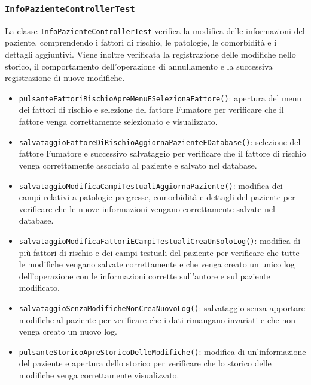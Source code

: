 \subsubsection*{\texttt{InfoPazienteControllerTest}}

La classe \texttt{InfoPazienteControllerTest} verifica la modifica delle informazioni del paziente, comprendendo i fattori di rischio, le patologie, le comorbidità e i dettagli aggiuntivi. Viene inoltre verificata la registrazione delle modifiche nello storico, il comportamento dell'operazione di annullamento e la successiva registrazione di nuove modifiche.

\begin{itemize}
	
	\item \texttt{pulsanteFattoriRischioApreMenuESelezionaFattore()}: apertura del menu dei fattori di rischio e selezione del fattore Fumatore per verificare che il fattore venga correttamente selezionato e visualizzato.
	
	\item \texttt{salvataggioFattoreDiRischioAggiornaPazienteEDatabase()}: selezione del fattore Fumatore e successivo salvataggio per verificare che il fattore di rischio venga correttamente associato al paziente e salvato nel database.
	
	\item \texttt{salvataggioModificaCampiTestualiAggiornaPaziente()}: modifica dei campi relativi a patologie pregresse, comorbidità e dettagli del paziente per verificare che le nuove informazioni vengano correttamente salvate nel database.
	
	\item \texttt{salvataggioModificaFattoriECampiTestualiCreaUnSoloLog()}: modifica di più fattori di rischio e dei campi testuali del paziente per verificare che tutte le modifiche vengano salvate correttamente e che venga creato un unico log dell'operazione con le informazioni corrette sull'autore e sul paziente modificato.
	
	\item \texttt{salvataggioSenzaModificheNonCreaNuovoLog()}: salvataggio senza apportare modifiche al paziente per verificare che i dati rimangano invariati e che non venga creato un nuovo log.
	
	\item \texttt{pulsanteStoricoApreStoricoDelleModifiche()}: modifica di un'informazione del paziente e apertura dello storico per verificare che lo storico delle modifiche venga correttamente visualizzato.
	

\end{itemize}
